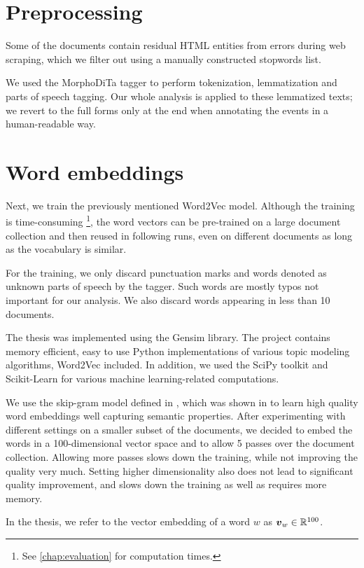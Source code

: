 \section{Preprocessing}
Some of the documents contain residual HTML entities from errors during web scraping, which we filter out using a manually constructed stopwords list.

We used the MorphoDiTa tagger \citep{morphodita} to perform tokenization, lemmatization and parts of speech tagging. Our whole analysis is applied to these lemmatized texts; we revert to the full forms only at the end when annotating the events in a human-readable way.


\section{Word embeddings} \label{word-embeddings}
Next, we train the previously mentioned Word2Vec model. Although the training is time-consuming \footnote{See \autoref{chap:evaluation} for computation times.}, the word vectors can be pre-trained on a large document collection and then reused in following runs, even on different documents as long as the vocabulary is similar.

For the training, we only discard punctuation marks and words denoted as unknown parts of speech by the tagger. Such words are mostly typos not important for our analysis. We also discard words appearing in less than 10 documents.

The thesis was implemented using the Gensim \citep{gensim} library. The project contains memory efficient, easy to use Python implementations of various topic modeling algorithms, Word2Vec included. In addition, we used the SciPy toolkit \citep{scipy} and Scikit-Learn \citep{scikit-learn} for various machine learning-related computations.

We use the skip-gram model defined in \cite{word2vec}, which was shown in \cite{distributed-representations} to learn high quality word embeddings well capturing semantic properties. After experimenting with different settings on a smaller subset of the documents, we decided to embed the words in a 100-dimensional vector space and to allow 5 passes over the document collection. Allowing more passes slows down the training, while not improving the quality very much. Setting higher dimensionality also does not lead to significant quality improvement, and slows down the training as well as requires more memory.

In the thesis, we refer to the vector embedding of a word $w$ as $\embed_{w} \in \R^{100}$.


